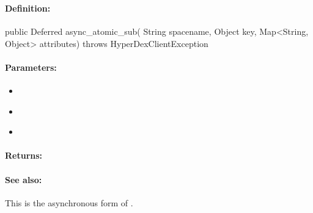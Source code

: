 \pagebreak
\subsubsection{}
\label{api:java:async_atomic_sub}


\paragraph{Definition:}
\begin{javacode}
public Deferred async_atomic_sub(
        String spacename,
        Object key,
        Map<String, Object> attributes) throws HyperDexClientException
\end{javacode}

\paragraph{Parameters:}
\begin{itemize}[noitemsep]
\item {}\\

\item {}\\

\item {}\\

\end{itemize}

\paragraph{Returns:}


\paragraph{See also:}  This is the asynchronous form of .

\pagebreak
\subsubsection{}
\label{api:java:cond_atomic_sub}



